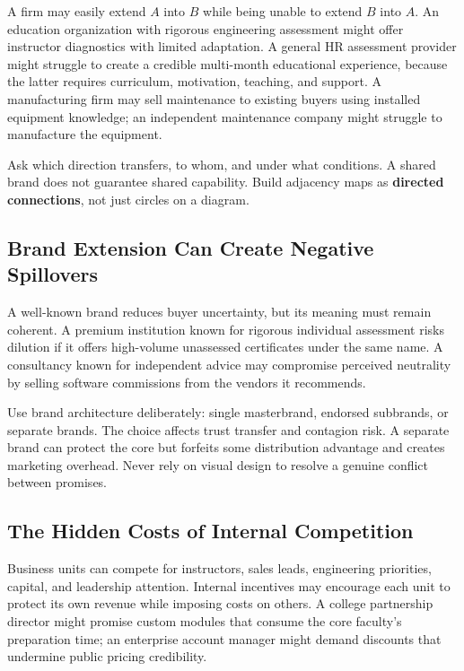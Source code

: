 A firm may easily extend $A$ into $B$ while being unable to extend $B$ into $A$. An education organization with rigorous engineering assessment might offer instructor diagnostics with limited adaptation. A general HR assessment provider might struggle to create a credible multi-month educational experience, because the latter requires curriculum, motivation, teaching, and support. A manufacturing firm may sell maintenance to existing buyers using installed equipment knowledge; an independent maintenance company might struggle to manufacture the equipment.

Ask which direction transfers, to whom, and under what conditions. A shared brand does not guarantee shared capability. Build adjacency maps as \textbf{directed connections}, not just circles on a diagram.

\subsection{Brand Extension Can Create Negative Spillovers}
\label{sec:brand_extension_negative_spillovers}

A well-known brand reduces buyer uncertainty, but its meaning must remain coherent. A premium institution known for rigorous individual assessment risks dilution if it offers high-volume unassessed certificates under the same name. A consultancy known for independent advice may compromise perceived neutrality by selling software commissions from the vendors it recommends.

Use brand architecture deliberately: single masterbrand, endorsed subbrands, or separate brands. The choice affects trust transfer and contagion risk. A separate brand can protect the core but forfeits some distribution advantage and creates marketing overhead. Never rely on visual design to resolve a genuine conflict between promises.

\subsection{The Hidden Costs of Internal Competition}
\label{sec:hidden_costs_internal_competition}

Business units can compete for instructors, sales leads, engineering priorities, capital, and leadership attention. Internal incentives may encourage each unit to protect its own revenue while imposing costs on others. A college partnership director might promise custom modules that consume the core faculty's preparation time; an enterprise account manager might demand discounts that undermine public pricing credibility.

